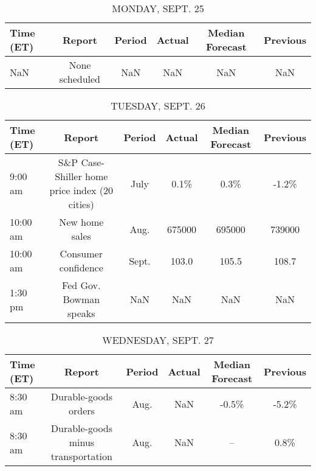 \documentclass{article}%
\begin{document}
%
\normalsize%


\begin{table}[htbp]%
\caption{MONDAY, SEPT. 25}%
\centering%
\begin{adjustbox}{width=1\textwidth}%
\begin{tabular}{lccccc}
\toprule
Time (ET) &         Report & Period & Actual & Median Forecast & Previous \\
\midrule
      NaN & None scheduled &    NaN &    NaN &             NaN &      NaN \\
\bottomrule
\end{tabular}
%
\end{adjustbox}%
\end{table}

%


\begin{table}[htbp]%
\caption{TUESDAY, SEPT. 26}%
\centering%
\begin{adjustbox}{width=1\textwidth}%
\begin{tabular}{lccccc}
\toprule
Time (ET) &                                        Report & Period & Actual & Median Forecast & Previous \\
\midrule
  9:00 am & S\&P Case-Shiller home price index (20 cities) &   July &   0.1\% &            0.3\% &    -1.2\% \\
 10:00 am &                                New home sales &   Aug. & 675000 &          695000 &   739000 \\
 10:00 am &                           Consumer confidence &  Sept. &  103.0 &           105.5 &    108.7 \\
  1:30 pm &                        Fed Gov. Bowman speaks &    NaN &    NaN &             NaN &      NaN \\
\bottomrule
\end{tabular}
%
\end{adjustbox}%
\end{table}

%


\begin{table}[htbp]%
\caption{WEDNESDAY, SEPT. 27}%
\centering%
\begin{adjustbox}{width=1\textwidth}%
\begin{tabular}{lccccc}
\toprule
Time (ET) &                             Report & Period & Actual & Median Forecast & Previous \\
\midrule
  8:30 am &               Durable-goods orders &   Aug. &    NaN &           -0.5\% &    -5.2\% \\
  8:30 am & Durable-goods minus transportation &   Aug. &    NaN &              -- &     0.8\% \\
\bottomrule
\end{tabular}
%
\end{adjustbox}%
\end{table}
\end{document}
